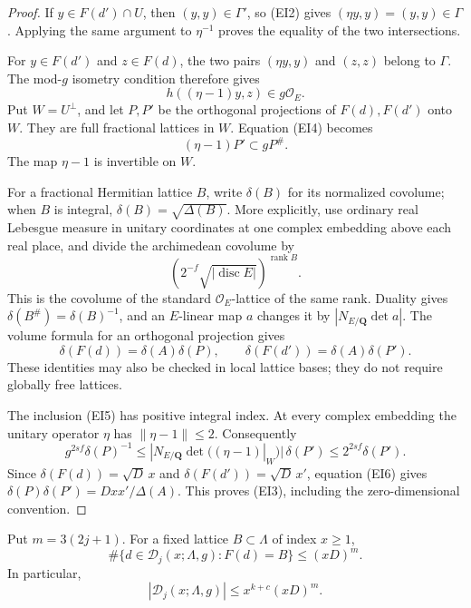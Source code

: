 \begin{proof}
If \(y\in F(d')\cap U\), then \((y,y)\in\Gamma'\), so
(EI2) gives \((\eta y,y)=(y,y)\in\Gamma\).  Applying the
same argument to \(\eta^{-1}\) proves the equality of the
two intersections.

For \(y\in F(d')\) and \(z\in F(d)\), the two pairs
\((\eta y,y)\) and \((z,z)\) belong to \(\Gamma\).
The mod-\(g\) isometry condition therefore gives
\[
                    h((\eta-1)y,z)\in g\mathcal O_E.
 \tag{EI4}
\]
Put \(W=U^\perp\), and let \(P,P'\) be the orthogonal
projections of \(F(d),F(d')\) onto \(W\).  They are full
fractional lattices in \(W\).  Equation (EI4) becomes
\[
                  (\eta-1)P'\subset gP^\#.
 \tag{EI5}
\]
The map \(\eta-1\) is invertible on \(W\).

For a fractional Hermitian lattice \(B\), write
\(\delta(B)\) for its normalized covolume; when \(B\)
is integral, \(\delta(B)=\sqrt{\Delta(B)}\).
More explicitly, use ordinary real Lebesgue measure in
unitary coordinates at one complex embedding above each
real place, and divide the archimedean covolume by
\[
       \left(2^{-f}\sqrt{|\operatorname{disc}E|}\right)^
                                               {\operatorname{rank}B}.
\]
This is the covolume of the standard \(\mathcal O_E\)-lattice
of the same rank.  Duality gives
\(\delta(B^\#)=\delta(B)^{-1}\), and an \(E\)-linear map
\(a\) changes it by \(|N_{E/\mathbf Q}\det a|\).
The volume formula for an orthogonal projection gives
\[
 \delta(F(d))=\delta(A)\delta(P),\qquad
 \delta(F(d'))=\delta(A)\delta(P').
 \tag{EI6}
\]
These identities may also be checked in local lattice bases;
they do not require globally free lattices.

The inclusion (EI5) has positive integral index.  At every
complex embedding the unitary operator \(\eta\) has
\(\|\eta-1\|\leq2\).  Consequently
\[
 g^{2sf}\delta(P)^{-1}
 \leq |N_{E/\mathbf Q}\det((\eta-1)|_W)|\,\delta(P')
 \leq2^{2sf}\delta(P').
\]
Since
\(\delta(F(d))=\sqrt D\,x\) and
\(\delta(F(d'))=\sqrt D\,x'\), equation (EI6) gives
\(\delta(P)\delta(P')=Dxx'/\Delta(A)\).
This proves (EI3), including the zero-dimensional convention.
\end{proof}

\begin{lemma}
\label{lem:embedded-data-count}
Put \(m=3(2j+1)\).  For a fixed lattice \(B\subset\Lambda\)
of index \(x\geq1\),
\[
 \#\{d\in\mathcal D_j(x;\Lambda,g):F(d)=B\}
                               \leq(xD)^m.
 \tag{EI7}
\]
In particular,
\[
             |\mathcal D_j(x;\Lambda,g)|
                    \leq x^{k+c}(xD)^m.
 \tag{EI8}
\]
\end{lemma}

